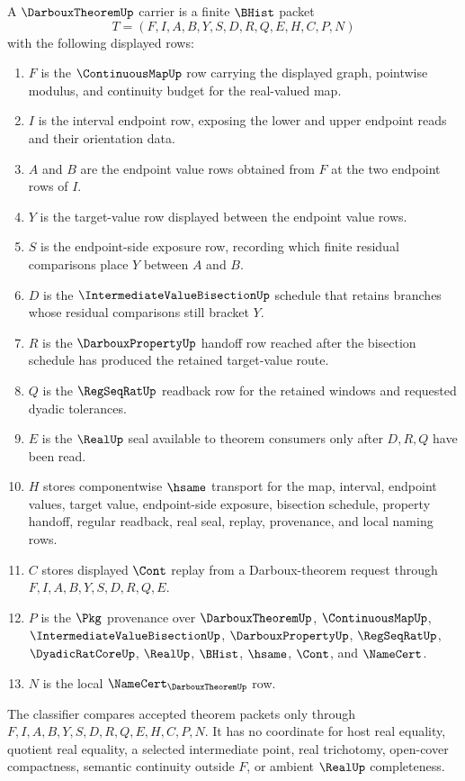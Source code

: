 \begin{definition}
\label{def:darboux-theorem-carrier}
A $\DarbouxTheoremUp$ carrier is a finite $\BHist$ packet
$$
T=(F,I,A,B,Y,S,D,R,Q,E,H,C,P,N)
$$
with the following displayed rows:
\begin{enumerate}
\item $F$ is the $\ContinuousMapUp$ row carrying the displayed graph, pointwise modulus, and continuity budget for the real-valued map.
\item $I$ is the interval endpoint row, exposing the lower and upper endpoint reads and their orientation data.
\item $A$ and $B$ are the endpoint value rows obtained from $F$ at the two endpoint rows of $I$.
\item $Y$ is the target-value row displayed between the endpoint value rows.
\item $S$ is the endpoint-side exposure row, recording which finite residual comparisons place $Y$ between $A$ and $B$.
\item $D$ is the $\IntermediateValueBisectionUp$ schedule that retains branches whose residual comparisons still bracket $Y$.
\item $R$ is the $\DarbouxPropertyUp$ handoff row reached after the bisection schedule has produced the retained target-value route.
\item $Q$ is the $\RegSeqRatUp$ readback row for the retained windows and requested dyadic tolerances.
\item $E$ is the $\RealUp$ seal available to theorem consumers only after $D,R,Q$ have been read.
\item $H$ stores componentwise $\hsame$ transport for the map, interval, endpoint values, target value, endpoint-side exposure, bisection schedule, property handoff, regular readback, real seal, replay, provenance, and local naming rows.
\item $C$ stores displayed $\Cont$ replay from a Darboux-theorem request through $F,I,A,B,Y,S,D,R,Q,E$.
\item $P$ is the $\Pkg$ provenance over $\DarbouxTheoremUp$, $\ContinuousMapUp$, $\IntermediateValueBisectionUp$, $\DarbouxPropertyUp$, $\RegSeqRatUp$, $\DyadicRatCoreUp$, $\RealUp$, $\BHist$, $\hsame$, $\Cont$, and $\NameCert$.
\item $N$ is the local $\NameCert_{\DarbouxTheoremUp}$ row.
\end{enumerate}
The classifier compares accepted theorem packets only through $F,I,A,B,Y,S,D,R,Q,E,H,C,P,N$. It has no coordinate for host real equality, quotient real equality, a selected intermediate point, real trichotomy, open-cover compactness, semantic continuity outside $F$, or ambient $\RealUp$ completeness.
\end{definition}

